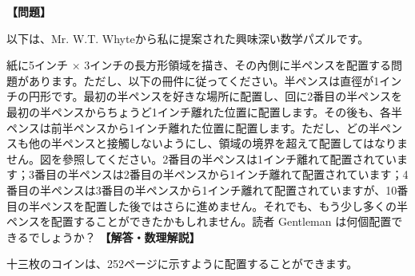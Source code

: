 \documentclass[10pt,a4paper,oneside,openany]{ltjsbook}
\begin{document}
\begin{tcolorbox}[colback=softblue,colframe=primaryblue,title=\textbf{第 429 問：半ペンニーの配置 （原題: PLACING HALFPENNIES.）},arc=2mm,boxrule=1pt,breakable]
\textbf{【問題】}\par\vspace{0.3em}
以下は、Mr. W.T. Whyteから私に提案された興味深い数学パズルです。

紙に5インチ × 3インチの長方形領域を描き、その內側に半ペンスを配置する問題があります。ただし、以下の冊件に従ってください。半ペンスは直徑が1インチの円形です。最初の半ペンスを好きな場所に配置し、回に2番目の半ペンスを最初の半ペンスからちょうど1インチ離れた位置に配置します。その後も、各半ペンスは前半ペンスから1インチ離れた位置に配置します。ただし、どの半ペンスも他の半ペンスと接觸しないようにし、領域の境界を超えて配置してはなりません。図を參照してください。2番目の半ペンスは1インチ離れて配置されています；3番目の半ペンスは2番目の半ペンスから1インチ離れて配置されています；4番目の半ペンスは3番目の半ペンスから1インチ離れて配置されていますが、10番目の半ペンスを配置した後ではさらに進めません。それでも、もう少し多くの半ペンスを配置することができたかもしれません。読者 Gentleman は何個配置できるでしょうか？
\tcblower
\textbf{【解答・数理解説】}\par\vspace{0.3em}
十三枚のコインは、252ページに示すように配置することができます。
\end{tcolorbox}
\end{document}
